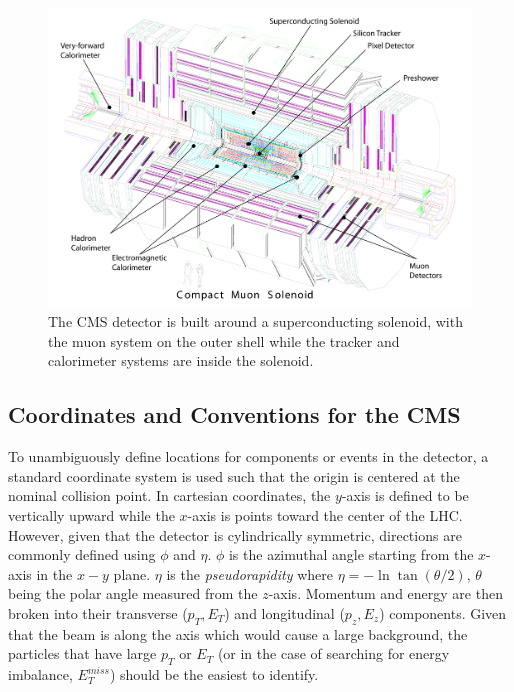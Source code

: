 \begin{figure}[htbp]
\begin{center}
\includegraphics[width=.9\linewidth]{Experiment/figures/ExplodedCMS.pdf}
\caption[The CMS Detector with Sub-Detector Systems]{The CMS detector is built around a superconducting solenoid, with the muon system on the outer shell while the tracker and calorimeter systems are inside the solenoid.}
\label{fig:ExplodedCMS}
\end{center}
\end{figure}

\subsection{Coordinates and Conventions for the CMS}
\label{sec:CoordinateConventions}

To unambiguously define locations for components or events in the detector, a standard coordinate system is used such that the origin is centered at the nominal collision point. In cartesian coordinates, the $y$-axis is defined to be vertically upward while the $x$-axis is points toward the center of the LHC. However, given that the detector is cylindrically symmetric, directions are commonly defined using $\phi$ and $\eta$. $\phi$ is the azimuthal angle starting from the $x$-axis in the $x-y$ plane. $\eta$ is the \textit{pseudorapidity} where $\eta=-\ln\tan(\theta/2)$, $\theta$ being the polar angle measured from the $z$-axis. Momentum and energy are then broken into their transverse ($p_T,E_T$) and longitudinal ($p_z,E_z$) components. Given that the beam is along the axis which would cause a large background, the particles that have large $p_T$ or $E_T$ (or in the case of searching for energy imbalance, $E_T^{miss}$) should be the easiest to identify.

